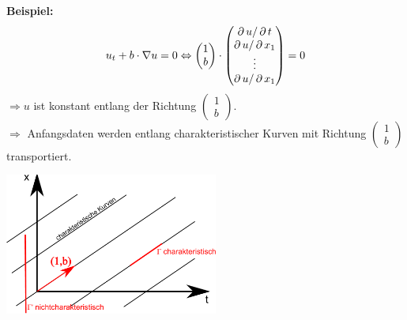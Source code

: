 \begin{bem}[Bemerkung]
\begin{itemize}
\begin{minipage}[t][2cm][b]{2.5cm}
		\end{minipage}
		\textbf{Beispiel:}
		\[ u_t + b \cdot \nabla u = 0 \Leftrightarrow \begin{pmatrix}1 \\ b \end{pmatrix} \cdot \begin{pmatrix}\operatorname{\partial} u / \operatorname{\partial} t \\ \operatorname{\partial} u / \operatorname{\partial} x_1 \\ \vdots \\ \operatorname{\partial} u / \operatorname{\partial} x_1	\end{pmatrix}  = 0 \]
		$\Rightarrow u$ ist konstant entlang der Richtung $\begin{pmatrix}1 \\ b \end{pmatrix}$. \\
		$\Rightarrow$ Anfangsdaten werden entlang charakteristischer Kurven mit Richtung  $\begin{pmatrix}1 \\ b \end{pmatrix}$ transportiert.
		\begin{center}
		\includegraphics[keepaspectratio, width=7cm]{img/2_bsp_charkurv.pdf}
		\end{center}
	\end{itemize}
\end{bem}
	
